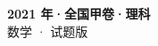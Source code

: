 \documentclass[zihao=-4, a4paper]{ctexart}
\begin{document}
\begin{center}
  {\Large\bfseries 2021 年·全国甲卷·理科}\\[4pt]
  {\large 数学 · 试题版}
\end{center}
\medskip
{}

\end{document}
